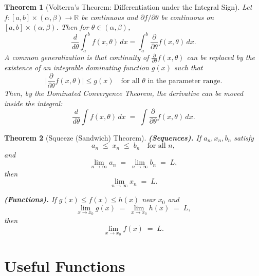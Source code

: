 \documentclass[11pt]{article}
\theoremstyle{plain}
\newtheorem{theorem}{Theorem}[section]
\theoremstyle{definition}
\theoremstyle{remark}
\newcommand{\1}{\mathbbm{1}}
\begin{document}
\vspace{1em}

\begin{theorem}[Volterra’s Theorem: Differentiation under the Integral Sign]
Let $f:[a,b]\times(\alpha,\beta)\to\mathbb{R}$ be continuous and $\partial f/\partial\theta$ be continuous on $[a,b]\times(\alpha,\beta)$. Then for $\theta\in(\alpha,\beta)$,
\[
\frac{d}{d\theta}\int_a^b f(x,\theta)\,dx
= \int_a^b \frac{\partial}{\partial\theta} f(x,\theta)\,dx.
\]
A common generalization is that continuity of $\tfrac{\partial}{\partial \theta} f(x,\theta)$ 
can be replaced by the existence of an \emph{integrable dominating function} $g(x)$ such that
\[
\Big|\frac{\partial}{\partial \theta} f(x,\theta)\Big| \le g(x)
\quad \text{for all } \theta \text{ in the parameter range}.
\]
Then, by the Dominated Convergence Theorem, the derivative can be 
moved inside the integral:
\[
\frac{d}{d\theta}\int f(x,\theta)\,dx \;=\; \int \frac{\partial}{\partial\theta} f(x,\theta)\, dx.
\]
\end{theorem}

\vspace{1em}

\begin{theorem}[Squeeze (Sandwich) Theorem]
\leavevmode

\noindent\textbf{(Sequences).} 
If $a_n, x_n, b_n$ satisfy 
\[
a_n \;\le\; x_n \;\le\; b_n \quad \text{for all } n,
\]
and
\[
\lim_{n\to\infty} a_n \;=\; \lim_{n\to\infty} b_n \;=\; L,
\]
then
\[
\lim_{n\to\infty} x_n \;=\; L.
\]

\medskip

\noindent\textbf{(Functions).} 
If $g(x) \le f(x) \le h(x)$ near $x_0$ and 
\[
\lim_{x\to x_0} g(x) \;=\; \lim_{x\to x_0} h(x) \;=\; L,
\]
then
\[
\lim_{x\to x_0} f(x) \;=\; L.
\]
\end{theorem}

\newpage 

\section{Useful Functions}
\end{document}
